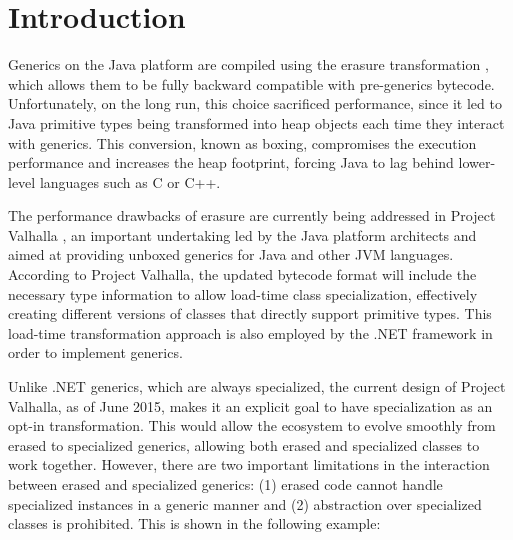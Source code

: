 \section{Introduction}
\label{sec:intro}

Generics on the Java platform are compiled using the erasure transformation \cite{java-erasure}, which allows them to be fully backward compatible with pre-generics bytecode. Unfortunately, on the long run, this choice sacrificed performance, since it led to Java primitive types being transformed into heap objects each time they interact with generics. This conversion, known as boxing, compromises the execution performance and increases the heap footprint, forcing Java to lag behind lower-level languages such as C or C++.

The performance drawbacks of erasure are currently being addressed in Project Valhalla \cite{goetz-specialization, rose-value-classes-tearing, rose-value-classes-vm}, an important undertaking led by the Java platform architects and aimed at providing unboxed generics for Java and other JVM languages. According to Project Valhalla, the updated bytecode format will include the necessary type information to allow load-time class specialization, effectively creating different versions of classes that directly support primitive types. This load-time transformation approach is also employed by the .NET framework \cite{dot-net-generics, dot-net-generics-form} in order to implement generics.


Unlike .NET generics, which are always specialized, the current design of Project Valhalla, as of June 2015, makes it an explicit goal to have specialization as an opt-in transformation. This would allow the ecosystem to evolve smoothly from erased to specialized generics, allowing both erased and specialized classes to work together. However, there are two important limitations in the interaction between erased and specialized generics: (1) erased code cannot handle specialized instances in a generic manner and (2) abstraction over specialized classes is prohibited. This is shown in the following example:

